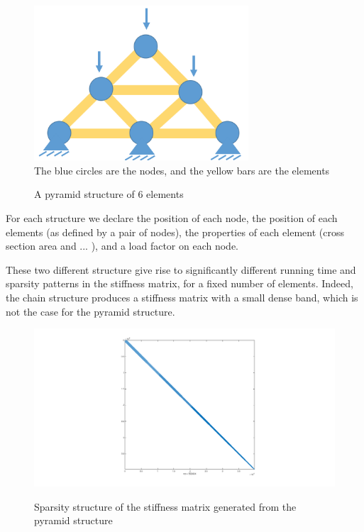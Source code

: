 \documentclass[11pt]{article}
\begin{document}
\begin{figure}[h]
\begin{center}

\caption{A pyramid structure of 6 elements}
\includegraphics[width=8cm]{pyramid}
\label{fig:pyramid}
\\
The blue circles are the nodes, and the yellow bars are the elements
\end{center}

\end{figure}



For each structure we declare the position of each node, the position of each elements (as defined by a pair of nodes), the properties of each element (cross section area and ... ), and a load factor on each node.

These two different structure give rise to significantly different running time and sparsity patterns in the stiffness matrix, for a fixed number of elements. Indeed, the chain structure produces a stiffness matrix with a small dense band, which is not the case for the pyramid structure.

\begin{figure}[H]
\begin{center}
\caption{Sparsity structure of the stiffness matrix generated from the pyramid structure}
\includegraphics[width=20cm]{pyramid-sparsity.png}
\label{fig:pyramid-sparsity}
\\
\end{center}

\end{figure}
\end{document}
